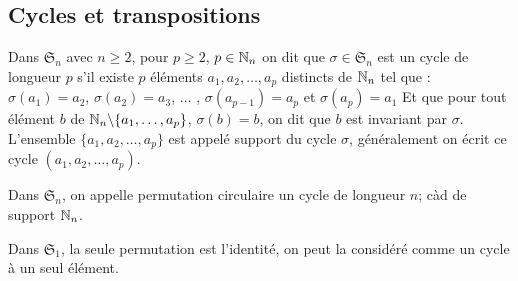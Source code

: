 \subsection{Cycles et transpositions}
\begin{defini}[Cycle]
Dans $\mathfrak{S}_n$ avec $n\geq 2$, pour $p\geq 2$, $p\in\mathbb{N}_n$ on dit que $\sigma\in\mathfrak{S}_n$ est un cycle de longueur $p$ s'il existe $p$ éléments $a_1,a_2,\dots,a_p$ distincts de $\mathbb{N}_n$ tel que :
$\sigma(a_1)=a_2$, $\sigma(a_2)=a_3$, $\dots$ , $\sigma(a_{p-1})=a_p$ et $\sigma(a_p)=a_1$
Et que pour tout élément $b$ de $\mathbb{N}_n\backslash\{a_1,\dots,a_p\}$, $\sigma(b)=b$, on dit que $b$ est invariant par $\sigma$.
L'ensemble $\{a_1,a_2,\dots,a_p\}$ est appelé support du cycle $\sigma$, généralement on écrit ce cycle $(a_1,a_2,\dots,a_p)$.

Dans $\mathfrak{S}_n$, on appelle permutation circulaire un cycle de longueur $n$; càd de support $\mathbb{N}_n$.

Dans $\mathfrak{S}_1$, la seule permutation est l'identité, on peut la considéré comme un cycle à un seul élément.
\end{defini}

